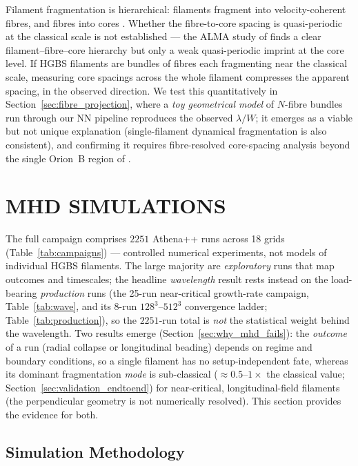 \documentclass[usenatbib,twoside,twocolumn]{mnras}
\begin{document}
Filament fragmentation is hierarchical: filaments fragment into velocity-coherent fibres, and fibres into cores \citep{Hacar2013,Hacar2018,Yang2024}. Whether the fibre-to-core spacing is quasi-periodic at the classical scale is not established --- the ALMA study of \citet{Yang2024} finds a clear filament--fibre--core hierarchy but only a weak quasi-periodic imprint at the core level. If HGBS filaments are bundles of fibres each fragmenting near the classical scale, measuring core spacings across the whole filament compresses the apparent spacing, in the observed direction. We test this quantitatively in Section~\ref{sec:fibre_projection}, where a \emph{toy geometrical model} of $N$-fibre bundles run through our NN pipeline reproduces the observed $\lambda/W$; it emerges as a viable but not unique explanation (single-filament dynamical fragmentation is also consistent), and confirming it requires fibre-resolved core-spacing analysis beyond the single Orion~B region of \citet{Yang2024}.

\section{MHD SIMULATIONS}

The full campaign comprises $2251$ Athena++ runs across 18 grids (Table~\ref{tab:campaigns}) --- controlled numerical experiments, not models of individual HGBS filaments. The large majority are \emph{exploratory} runs that map outcomes and timescales; the headline \emph{wavelength} result rests instead on the load-bearing \emph{production} runs (the 25-run near-critical growth-rate campaign, Table~\ref{tab:wave}, and its 8-run $128^3$--$512^3$ convergence ladder; Table~\ref{tab:production}), so the $2251$-run total is \emph{not} the statistical weight behind the wavelength. Two results emerge (Section~\ref{sec:why_mhd_fails}): the \emph{outcome} of a run (radial collapse or longitudinal beading) depends on regime and boundary conditions, so a single filament has no setup-independent fate, whereas its dominant fragmentation \emph{mode} is sub-classical ($\approx0.5$--$1\times$ the classical value; Section~\ref{sec:validation_endtoend}) for near-critical, longitudinal-field filaments (the perpendicular geometry is not numerically resolved). This section provides the evidence for both.

\subsection{Simulation Methodology}
\end{document}
